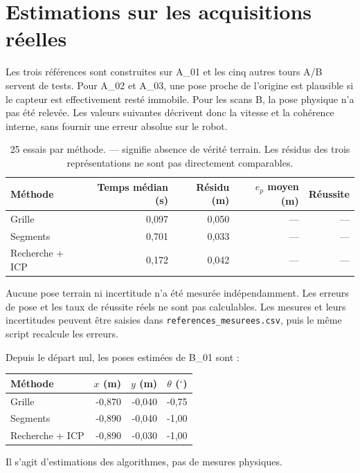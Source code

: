 \documentclass[11pt,a4paper]{article}
\begin{document}
\section{Estimations sur les acquisitions réelles}
Les trois références sont construites sur A\_01 et les cinq autres tours
A/B servent de tests. Pour A\_02 et A\_03, une pose proche de l'origine
est plausible si le capteur est effectivement resté immobile. Pour les
scans B, la pose physique n'a pas été relevée. Les valeurs suivantes
décrivent donc la vitesse et la cohérence interne, sans fournir une
erreur absolue sur le robot.
\begin{table}[H]\centering\small
\begin{tabular}{lrrrr}\toprule Méthode & Temps médian (s) & Résidu (m) &
$e_p$ moyen (m) & Réussite\\\midrule
Grille & 0,097 & 0,050 & --- & --- \\
Segments & 0,701 & 0,033 & --- & --- \\
Recherche + ICP & 0,172 & 0,042 & --- & --- \\
\bottomrule\end{tabular}
\caption{25 essais par méthode. --- signifie absence de vérité
terrain. Les résidus des trois représentations ne sont pas directement comparables.}
\end{table}
Aucune pose terrain ni incertitude n'a été mesurée indépendamment. Les erreurs de pose et les taux de réussite réels ne sont pas calculables. Les mesures et leurs incertitudes peuvent être saisies dans
\texttt{references\_mesurees.csv}, puis le même script recalcule les erreurs.

Depuis le départ nul, les poses estimées de B\_01 sont :
\begin{center}\small
\begin{tabular}{lrrr}\toprule Méthode & $x$ (m) & $y$ (m) & $\theta$ ($^\circ$)\\
\midrule
Grille & -0,870 & -0,040 & -0,75 \\
Segments & -0,890 & -0,040 & -1,00 \\
Recherche + ICP & -0,890 & -0,030 & -1,00 \\
\bottomrule\end{tabular}
\end{center}
Il s'agit d'estimations des algorithmes, pas de mesures physiques.
\end{document}
